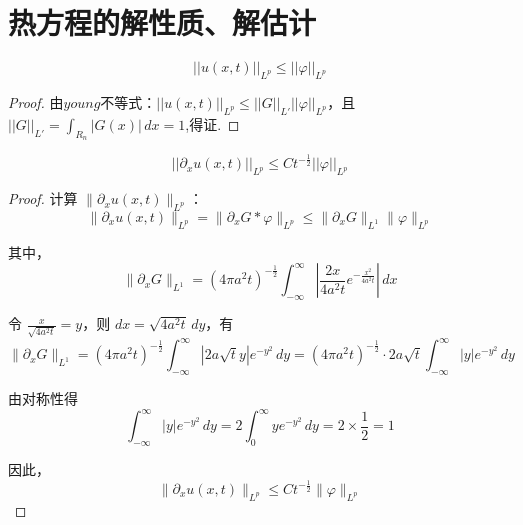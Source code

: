 \section{热方程的解性质、解估计}

\begin{theorem}
$$||u(x,t)||_{L^p}\leq ||\varphi||_{L^p}$$
\end{theorem}

\begin{proof}
    由$young$不等式：$||u(x,t)||_{L^p}\leq ||G||_{L'} ||\varphi||_{L^p}$，且$||G||_{L'} = \int_{R_n}|G(x)|\,dx=1$,得证.
\end{proof}

\begin{theorem}
    $$||\partial_x u(x,t)||_{L^p} \leq Ct^{-\frac{1}{2}}||\varphi||_{L^p}$$
\end{theorem}

\begin{proof}
计算 $\| \partial_x u(x, t) \|_{L^p}$：
$$\| \partial_x u(x, t) \|_{L^p} = \| \partial_x G * \varphi \|_{L^p} \leq \| \partial_x G \|_{L^1} \| \varphi \|_{L^p}$$

其中，
$$\| \partial_x G \|_{L^1} = (4\pi a^2 t)^{-\frac{1}{2}} \int_{-\infty}^{\infty} \left| \frac{2x}{4a^2t}e^{-\frac{x^2}{4a^2t}} \right| \, dx$$

令 $\frac{x}{\sqrt{4a^2 t}} = y$，则 $dx = \sqrt{4a^2 t} \, dy$，有
$$\| \partial_x G \|_{L^1} = (4\pi a^2 t)^{-\frac{1}{2}} \int_{-\infty}^{\infty} \left| 2 a \sqrt{t} y \right| e^{-y^2} \, dy = (4\pi a^2 t)^{-\frac{1}{2}} \cdot 2a \sqrt{t} \int_{-\infty}^{\infty} |y| e^{-y^2} \, dy$$

由对称性得
$$\int_{-\infty}^{\infty} |y| e^{-y^2} \, dy = 2 \int_{0}^{\infty} y e^{-y^2} \, dy = 2 \times \frac{1}{2} = 1$$

因此，
$$\| \partial_x u(x, t) \|_{L^p} \leq C t^{-\frac{1}{2}} \| \varphi \|_{L^p}$$
\end{proof}